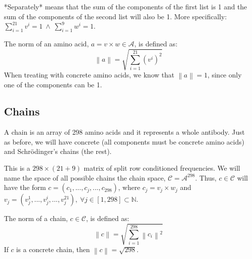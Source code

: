 *Separately* means that the sum of the components of the first list is 1 and the sum of the components of the second list will also be 1.\futnotetext
{} More specifically: $\sum_{i=1}^{21} v^i = 1\ \wedge\ \sum_{i=1}^{9}w^i=1 $.\futnotetext{}

The norm of an amino acid, $a=v\times w\in\mathcal A$, is defined as:
\begin{equation*}
    \left\| a \right\| = \sqrt{\sum_{i=1}^{21} (v^i)^2} 
\end{equation*}
When treating with concrete amino acids, we know that \(\left\| a \right\| = 1\), since only one of the components can be 1.


\subsection{Chains}

A chain is an array of 298 amino acids and it represents a whole antibody. Just as before, we will have concrete (all components must be concrete amino acids) and Schrödinger's chains (the rest).

This is a $298 \times (21 + 9)$ matrix of split row conditioned frequencies. We will name the space of all possible chains the chain space, $\mathcal C=\mathcal A^{298}$. Thus, $c\in \mathcal C$ will have the form $c=(c_1,...,c_j,...,c_{298})$, where $c_j=v_j\times w_j$ and $v_j=(v_j^1,...,v_j^i,...,v_j^{21}),\ \forall j\in[1,298]\subset\mathbb N$.

The norm of a chain, \(c\in\mathcal C\), is defined as:
\begin{equation*}
    \left\| c \right\| = \sqrt{\sum_{i=1}^{298} \left\| c_i \right\| ^2} 
\end{equation*}
If $c$ is a concrete chain, then \(\left\| c \right\| =\sqrt{298}\).




